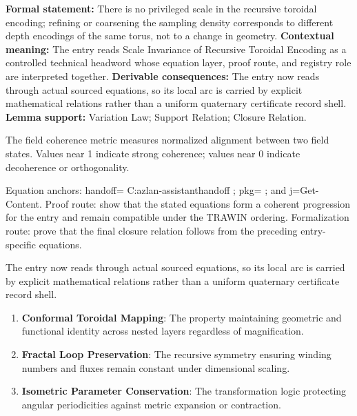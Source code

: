 \begingroup\footnotesize\setlength{\emergencystretch}{3em}\sloppy
\textbf{Formal statement:} There is no privileged scale in the recursive toroidal encoding; refining or coarsening the sampling density corresponds to different depth encodings of the same torus, not to a change in geometry. \textbf{Contextual meaning:} The entry reads Scale Invariance of Recursive Toroidal Encoding as a controlled technical headword whose equation layer, proof route, and registry role are interpreted together. \textbf{Derivable consequences:} The entry now reads through actual sourced equations, so its local arc is carried by explicit mathematical relations rather than a uniform quaternary certificate record shell. \textbf{Lemma support:} Variation Law; Support Relation; Closure Relation.\par
\endgroup

The field coherence metric measures normalized alignment between two field states. Values near 1 indicate strong coherence; values near 0 indicate decoherence or orthogonality.

Equation anchors: handoff= C:azlan-assistanthandoff ; pkg= ; and j=Get-Content. Proof route: show that the stated equations form a coherent progression for the entry and remain compatible under the TRAWIN ordering. Formalization route: prove that the final closure relation follows from the preceding entry-specific equations.

The entry now reads through actual sourced equations, so its local arc is carried by explicit mathematical relations rather than a uniform quaternary certificate record shell.
\endgroup

\begin{enumerate}[leftmargin=1.6em,itemsep=6pt,topsep=4pt]
\item \textbf{Conformal Toroidal Mapping}: The property maintaining geometric and functional identity across nested layers regardless of magnification.
\item \textbf{Fractal Loop Preservation}: The recursive symmetry ensuring winding numbers and fluxes remain constant under dimensional scaling.
\item \textbf{Isometric Parameter Conservation}: The transformation logic protecting angular periodicities against metric expansion or contraction.
\end{enumerate}

